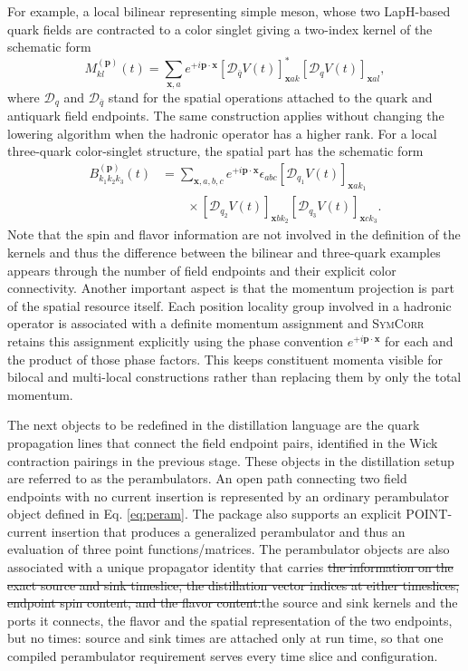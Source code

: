 \documentclass[a4paper,fleqn]{cas-dc}
\newcommand{\del}[1]{{\color{red}\sout{#1}}}
\newcommand{\add}[1]{{\color{blue}#1}}
\begin{document}
For example, a local bilinear representing simple meson, whose two LapH-based quark fields are contracted to a color singlet giving a two-index kernel of the schematic form
\begin{equation}
M_{kl}^{(\mathbf p)}(t) =
\sum_{\mathbf x,a}
 e^{+i\mathbf p\cdot\mathbf x}
 \left[\mathcal D_{\bar q}V(t)\right]^*_{\mathbf x a k}
 \left[\mathcal D_q V(t)\right]_{\mathbf x a l},
\label{eq:bilinear_spatial_kernel}
\end{equation}
where \(\mathcal D_q\) and \(\mathcal D_{\bar q}\) stand for the spatial operations attached to the quark and antiquark field endpoints. The same construction applies without changing the lowering algorithm when the hadronic operator has a higher rank. For a local three-quark color-singlet structure, the spatial part has the schematic form
\begin{align}
B_{k_1k_2k_3}^{(\mathbf p)}(t)
&=
\sum_{\mathbf x,a,b,c}
 e^{+i\mathbf p\cdot\mathbf x}
 \epsilon_{abc}
 \left[\mathcal D_{q_1} V(t)\right]_{\mathbf x a k_1}\nonumber\\
&\qquad\times
 \left[\mathcal D_{q_2} V(t)\right]_{\mathbf x b k_2}
 \left[\mathcal D_{q_3} V(t)\right]_{\mathbf x c k_3}.
\label{eq:three_quark_spatial_kernel}
\end{align}
Note that the spin and flavor information are not involved in the definition of the kernels and thus the difference between the bilinear and three-quark examples appears through the number of field endpoints and their explicit color connectivity. Another important aspect is that the momentum projection is part of the spatial resource itself. Each position locality group involved in a hadronic operator is associated with a definite momentum assignment and \textsc{SymCorr} retains this assignment explicitly using the phase convention $e^{+i\mathbf p\cdot\mathbf x}$ for each and the product of those phase factors. This keeps constituent momenta visible for bilocal and multi-local constructions rather than replacing them by only the total momentum.

The next objects to be redefined in the distillation language are the quark propagation lines that connect the field endpoint pairs, identified in the Wick contraction pairings in the previous stage. These objects in the distillation setup are referred to as the perambulators. An open path connecting two field endpoints with no current insertion is represented by an ordinary perambulator object defined in Eq. \ref{eq:peram}. The package also supports an explicit POINT-current insertion that produces a generalized perambulator and thus an evaluation of three point functions/matrices. The perambulator objects are also associated with a unique propagator identity that carries \del{the information on the exact source and sink timeslice, the distillation vector indices at either timeslices, endpoint spin content, and the flavor content.}\add{the source and sink kernels and the ports it connects, the flavor and the spatial representation of the two endpoints, but no times: source and sink times are attached only at run time, so that one compiled perambulator requirement serves every time slice and configuration.} 
\end{document}
